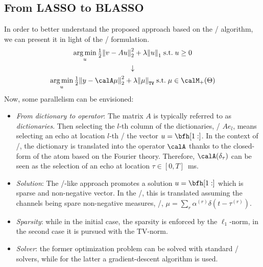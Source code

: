 \subsection{From LASSO to BLASSO}
In order to better understand the proposed approach based on the \BLASSO/ algorithm, we can present it in light of the \LASSO/ formulation.
\begin{gather*}
    \kargmin_u \tfrac{1}{2} \kvvbar{v - A u}_2^2 + \lambda \kvvbar{u}_1 \;\text{s.t.}\; u \geq 0\\
    \downarrow\\
    \kargmin_u \tfrac{1}{2} \kvvbar{y - \opObs\mu}_2^2 + \lambda \normTV{\mu} \;\text{s.t.}\; \mu \in\posDisRadonMeasure\\
\end{gather*}
Now, some parallelism can be envisioned:
\begin{itemize}
    \item\textit{From dictionary to operator}:
    The matrix $A$ is typically referred to as \textit{dictionaries}.
    Then selecting the $l$-th column of the dictionaries, \ie/ $Ae_l$, means selecting an echo at location $l$-th \wrt/ the vector $u = \bfh[1:]$.
    In the context of \CD/, the dictionary is translated into the operator $\opObs$ thanks to the closed-form of the atom based on the Fourier theory.
    Therefore, $\opObs(\delta_\tau)$ can be seen as the selection of an echo at location $\tau \in [0, T]$~ms.
    \item\textit{Solution}:
    The \LASSO/-like approach promotes a solution $u = \bfh[1:]$ which is sparse and non-negative vector.
    In the \BLASSO/, this is translated assuming the channels being spare non-negative measures, \ie/, $\mu = \sum_r \alpha^{(r)} \delta(t - \tau^{(r)})$.
    \item\textit{Sparsity}: while in the initial case, the sparsity is enforced by the $\ell_1$-norm, in the second case it is pursued with the TV-norm.
    \item\textit{Solver}: the former optimization problem can be solved with standard \LASSO/ solvers, while for the latter a gradient-descent algorithm is used.
\end{itemize}


